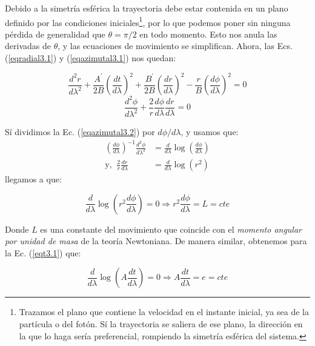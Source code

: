 Debido a la simetría esférica la trayectoria debe estar contenida en un plano definido por las condiciones iniciales\footnote{Trazamos el plano que contiene la velocidad en el instante inicial, ya sea de la partícula o del fotón. Sí la trayectoria se saliera de ese plano, la dirección en la que lo haga sería preferencial, rompiendo la simetría esférica del sistema.}, por lo que podemos poner sin ninguna pérdida de generalidad que $\theta=\pi/2$ en todo momento. Esto nos anula las derivadas de $\theta$, y las ecuaciones de movimiento se simplifican. Ahora, las Ecs. (\ref{eqradial3.1}) y (\ref{eqazimutal3.1}) nos quedan:

\begin{equation}
    \frac{d^2 r}{d \lambda^2} + \frac{A^\prime}{2B} \left(\frac{d t}{d \lambda}\right)^2 + \frac{B^\prime}{2B} \left(\frac{d r}{d \lambda}\right)^2 -  \frac{r}{B} \left(\frac{d \phi}{d \lambda}\right)^2 = 0
\label{eqradial3.2}
\end{equation}
\begin{equation}
    \frac{d^2 \phi}{d \lambda^2} + \frac{2}{r} \frac{d \phi}{d \lambda} \frac{d r}{d \lambda}= 0
\label{eqazimutal3.2}
\end{equation}

Sí dividimos la Ec. (\ref{eqazimutal3.2}) por $d\phi/d\lambda$, y usamos que:
\begin{equation}
\begin{split}
    \left(\frac{d\phi}{d\lambda}\right)^{-1} \frac{d^2\phi}{d\lambda^2} &= \frac{d}{d\lambda} \log{\left(\frac{d\phi}{d\lambda}\right)}\\
    \text{y, }\ \frac{2}{r} \frac{dr}{d\lambda} &= \frac{d}{d\lambda}\log{(r^2)}
\end{split}
\end{equation}
llegamos a que:

\begin{equation}
    \frac{d}{d\lambda}\log{\left(r^2\frac{d\phi}{d\lambda}\right)}=0 \Rightarrow r^2 \frac{d\phi}{d\lambda} = L = cte
\label{eqL}
\end{equation}

Donde $L$ es una constante del movimiento que coincide con el \textit{momento angular por unidad de masa} de la teoría Newtoniana. De manera similar, obtenemos para la Ec. (\ref{eqt3.1}) que:

\begin{equation}
    \frac{d}{d\lambda}\log{\left(A\frac{dt}{d\lambda}\right)}=0 \Rightarrow A \frac{dt}{d\lambda} = e = cte
\label{eqe}
\end{equation}


